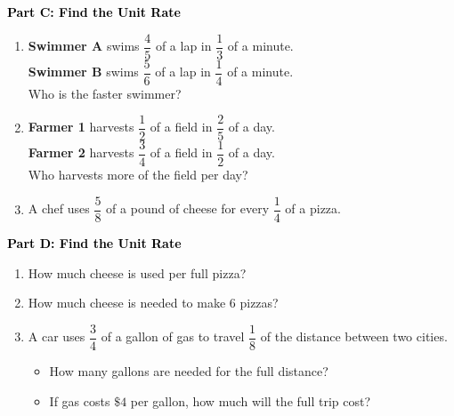 \documentclass[12pt, letterpaper, fleqn]{article}
\begin{document}
\newpage

\begin{tcolorbox}[colback=customteal!20]
\large\textcolor{black}{\textbf{Part C: Find the Unit Rate}}
\end{tcolorbox}

\vspace{3mm}

\begin{enumerate}[itemsep=5.5cm, leftmargin=0.6cm, resume]
\item \textbf{Swimmer A} swims $\dfrac{4}{5}$ of a lap in $\dfrac{1}{3}$ of a minute. \\
\textbf{Swimmer B} swims $\dfrac{5}{6}$ of a lap in $\dfrac{1}{4}$ of a minute. \\
Who is the faster swimmer?
\item \textbf{Farmer 1} harvests $\dfrac{1}{2}$ of a field in $\dfrac{2}{5}$ of a day. \\
\textbf{Farmer 2} harvests $\dfrac{3}{4}$ of a field in $\dfrac{1}{2}$ of a day. \\
Who harvests more of the field per day?
\item A chef uses $\dfrac{5}{8}$ of a pound of cheese for every $\dfrac{1}{4}$ of a pizza.
\end{enumerate}

\newpage

\begin{tcolorbox}[colback=customteal!20]
\large\textcolor{black}{\textbf{Part D: Find the Unit Rate}}
\end{tcolorbox}

\vspace{3mm}

\begin{enumerate}[itemsep=5.5cm, leftmargin=0.6cm, resume]
\item How much cheese is used per full pizza?
\item How much cheese is needed to make $6$ pizzas?
\item A car uses $\dfrac{3}{4}$ of a gallon of gas to travel $\dfrac{1}{8}$ of the distance between two cities.
\begin{itemize}
\item How many gallons are needed for the full distance?
\item If gas costs $\$4$ per gallon, how much will the full trip cost?
\end{itemize}
\end{enumerate}
\end{document}
